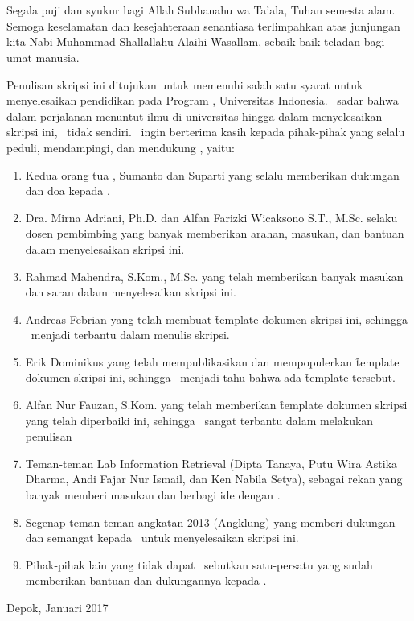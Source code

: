 \chapter*{\kataPengantar}

Segala puji dan syukur bagi Allah Subhanahu wa Ta'ala, Tuhan semesta alam. Semoga keselamatan dan kesejahteraan senantiasa terlimpahkan atas junjungan kita Nabi Muhammad Shallallahu Alaihi Wasallam, sebaik-baik teladan bagi umat manusia.

Penulisan skripsi ini ditujukan untuk memenuhi salah satu syarat untuk menyelesaikan pendidikan pada Program \gelar, Universitas Indonesia. \Saya~sadar bahwa dalam perjalanan menuntut ilmu di universitas hingga dalam menyelesaikan skripsi ini, \saya~tidak sendiri. \Saya~ingin berterima kasih kepada pihak-pihak yang selalu peduli, mendampingi, dan mendukung \saya, yaitu:

\begin{enumerate}
	\item Kedua orang tua \saya, Sumanto dan Suparti yang selalu memberikan dukungan dan doa kepada \saya.
	\item Dra. Mirna Adriani, Ph.D. dan Alfan Farizki Wicaksono S.T., M.Sc. selaku dosen pembimbing yang banyak memberikan arahan, masukan, dan bantuan dalam menyelesaikan skripsi ini.
	\item Rahmad Mahendra, S.Kom., M.Sc. yang telah memberikan banyak masukan dan saran dalam menyelesaikan skripsi ini.
	\item Andreas Febrian yang telah membuat \f{template} dokumen skripsi ini, sehingga \saya~menjadi terbantu dalam menulis skripsi.
	\item Erik Dominikus yang telah mempublikasikan dan mempopulerkan \f{template} dokumen skripsi ini, sehingga \saya~menjadi tahu bahwa ada \f{template} tersebut.
	\item Alfan Nur Fauzan, S.Kom. yang telah memberikan \f{template} dokumen skripsi yang telah diperbaiki ini, sehingga \saya~sangat terbantu dalam melakukan penulisan
	\item Teman-teman Lab Information Retrieval (Dipta Tanaya, Putu Wira Astika Dharma, Andi Fajar Nur Ismail, dan Ken Nabila Setya), sebagai rekan yang banyak memberi masukan dan berbagi ide dengan \saya.
	\item Segenap teman-teman angkatan 2013 (Angklung) yang memberi dukungan dan semangat kepada \saya~untuk menyelesaikan skripsi ini.
	\item Pihak-pihak lain yang tidak dapat \saya~sebutkan satu-persatu yang sudah memberikan bantuan dan dukungannya kepada \saya.
\end{enumerate}
\vspace*{0.1cm}
\begin{flushright}
Depok, Januari 2017\\[0.1cm]
\vspace*{1cm}
\penulis

\end{flushright}